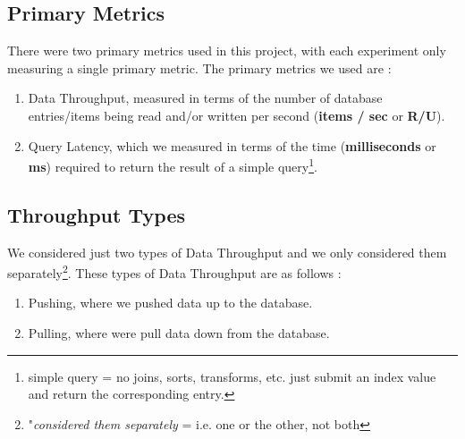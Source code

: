 
\subsection{Primary Metrics}

There were two primary metrics used in this project, with each experiment only measuring a single primary metric.  The primary metrics we used are :

\vspace{0.1in}
\begin{spacing}{1.2}
\begin{enumerate}[label=\large{\textbf{2-\alph*}):}]
	\item Data Throughput, measured in terms of the number of database entries/items being read and/or written per second (\textbf{items / sec} or \textbf{R/U}).
	\vspace{0.05in}
	\item Query Latency, which we measured in terms of the time (\textbf{milliseconds} or \textbf{ms}) required to return the result of a simple query\footnote{simple query = no joins, sorts, transforms, etc. just submit an index value and return the corresponding entry.}.
\end{enumerate}
\end{spacing}



\subsection{Throughput Types}

We considered just two types of Data Throughput and we only considered them separately\footnote{"\emph{considered them separately} = i.e. one or the other, not both}.  These types of Data Throughput are as follows :

\vspace{0.1in}
\begin{spacing}{1.2}
\begin{enumerate}[label=\large{\textbf{3-\alph*}):}]
	\item Pushing, where we pushed data up to the database.
	\vspace{0.05in}
	\item Pulling, where were pull data down from the database.
\end{enumerate}
\end{spacing}


